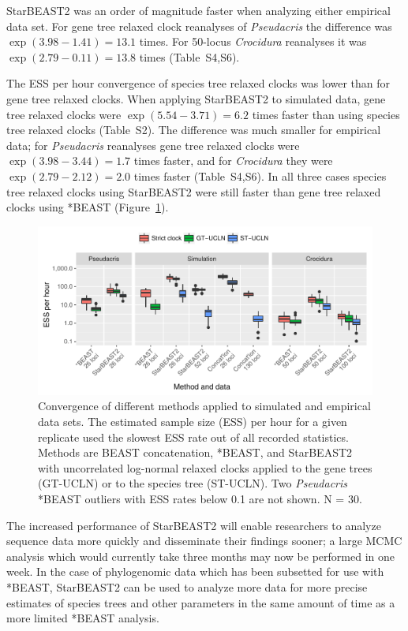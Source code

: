 \documentclass[nogrid]{MBE}%
\begin{document}
StarBEAST2 was an order of magnitude faster when analyzing either
empirical data set. For gene tree relaxed clock reanalyses of
\textit{Pseudacris} the difference was $\exp(3.98 - 1.41) = 13.1$ times. For
50-locus \textit{Crocidura} reanalyses it was $\exp(2.79 - 0.11) = 13.8$ times
(Table~S4,S6).

The ESS per hour convergence of species tree relaxed clocks was lower than for
gene tree relaxed clocks. When applying StarBEAST2 to simulated data, gene tree relaxed clocks were
$\exp(5.54 - 3.71) = 6.2$ times faster than using species tree relaxed clocks (Table~S2). The difference was much smaller for empirical data;
for \textit{Pseudacris} reanalyses gene tree relaxed clocks were $\exp(3.98 -
3.44) = 1.7$ times faster, and for \textit{Crocidura} they were $\exp(2.79 -
2.12) = 2.0$ times faster (Table~S4,S6). In all three cases species tree relaxed clocks
using StarBEAST2 were still faster than gene tree relaxed clocks using *BEAST
(Figure~\ref{fig:essPerHourComparison}).

\begin{figure}[htb!]
\centering
\includegraphics[width=\textwidth]{minimum_ess_per_hour_comparison.pdf}
\caption
{Convergence of different methods applied to simulated and empirical data
sets. The estimated sample size (ESS) per hour for a given replicate used the
slowest ESS rate out of all recorded statistics. Methods are BEAST
concatenation, *BEAST, and StarBEAST2 with uncorrelated log-normal relaxed
clocks applied to the gene trees (GT-UCLN) or to the species tree (ST-UCLN).
Two \textit{Pseudacris} *BEAST outliers with ESS rates below 0.1
are not shown.  N = 30.}
\label{fig:essPerHourComparison}
\end{figure}

The increased performance of StarBEAST2 will enable researchers to analyze
sequence data more quickly and disseminate their findings sooner; a large MCMC
analysis which would currently take three months may now be performed in one
week. In the case of phylogenomic data which has been subsetted for use with
*BEAST, StarBEAST2 can be used to analyze more data for more
precise estimates of species trees and other parameters in the same amount of
time as a more limited *BEAST analysis.
\end{document}
